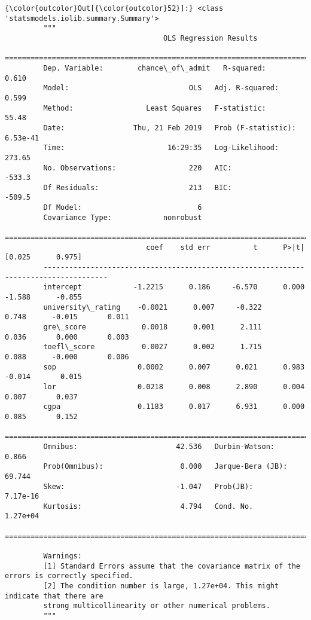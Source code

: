 \documentclass[11pt]{article}
\begin{document}
\begin{Verbatim}[commandchars=\\\{\}]
{\color{outcolor}Out[{\color{outcolor}52}]:} <class 'statsmodels.iolib.summary.Summary'>
         """
                                     OLS Regression Results                            
         ==============================================================================
         Dep. Variable:        chance\_of\_admit   R-squared:                       0.610
         Model:                            OLS   Adj. R-squared:                  0.599
         Method:                 Least Squares   F-statistic:                     55.48
         Date:                Thu, 21 Feb 2019   Prob (F-statistic):           6.53e-41
         Time:                        16:29:35   Log-Likelihood:                 273.65
         No. Observations:                 220   AIC:                            -533.3
         Df Residuals:                     213   BIC:                            -509.5
         Df Model:                           6                                         
         Covariance Type:            nonrobust                                         
         =====================================================================================
                                 coef    std err          t      P>|t|      [0.025      0.975]
         -------------------------------------------------------------------------------------
         intercept            -1.2215      0.186     -6.570      0.000      -1.588      -0.855
         university\_rating    -0.0021      0.007     -0.322      0.748      -0.015       0.011
         gre\_score             0.0018      0.001      2.111      0.036       0.000       0.003
         toefl\_score           0.0027      0.002      1.715      0.088      -0.000       0.006
         sop                   0.0002      0.007      0.021      0.983      -0.014       0.015
         lor                   0.0218      0.008      2.890      0.004       0.007       0.037
         cgpa                  0.1183      0.017      6.931      0.000       0.085       0.152
         ==============================================================================
         Omnibus:                       42.536   Durbin-Watson:                   0.866
         Prob(Omnibus):                  0.000   Jarque-Bera (JB):               69.744
         Skew:                          -1.047   Prob(JB):                     7.17e-16
         Kurtosis:                       4.794   Cond. No.                     1.27e+04
         ==============================================================================
         
         Warnings:
         [1] Standard Errors assume that the covariance matrix of the errors is correctly specified.
         [2] The condition number is large, 1.27e+04. This might indicate that there are
         strong multicollinearity or other numerical problems.
         """
\end{Verbatim}
            
\end{document}
